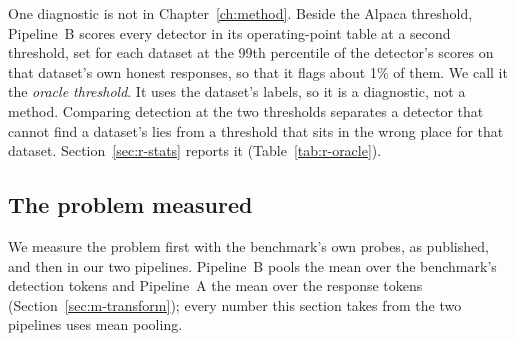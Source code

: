 One diagnostic is not in Chapter~\ref{ch:method}.
Beside the Alpaca threshold, Pipeline~B scores every detector in its operating-point table at a second threshold, set for each dataset at the 99th percentile of the detector's scores on that dataset's own honest responses, so that it flags about 1\% of them. %
We call it the \emph{oracle threshold}.
It uses the dataset's labels, so it is a diagnostic, not a method. %
Comparing detection at the two thresholds separates a detector that cannot find a dataset's lies from a threshold that sits in the wrong place for that dataset. %
Section~\ref{sec:r-stats} reports it (Table~\ref{tab:r-oracle}).

\subsection{The problem measured}
\label{sec:r-problem}

We measure the problem first with the benchmark's own probes, as published, and then in our two pipelines.
Pipeline~B pools the mean over the benchmark's detection tokens and Pipeline~A the mean over the response tokens (Section~\ref{sec:m-transform}); every number this section takes from the two pipelines uses mean pooling. %


